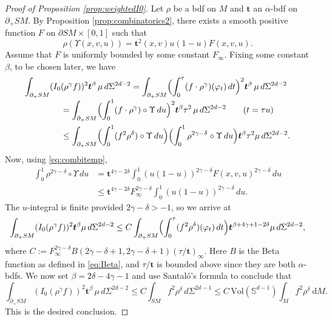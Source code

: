 \documentclass[11pt]{article}
\theoremstyle{plain}
\theoremstyle{definition}
\theoremstyle{remark}
\def\Sm{\mathbb{S}}
\newcommand{\bt}{{\boldsymbol{t}}}
\newcommand {\dM}{\mathrm{d}M}
\newcommand{\del}{\partial}
\begin{document}
\begin{proof}[Proof of Proposition \ref{prop:weightedI0}] Let $\rho$ be a bdf on $M$ and $\bt$ an $\alpha$-bdf on $\partial_+ SM$. By Proposition \ref{prop:combinatorics2}, there exists a smooth positive function $F$ on $\del SM\times [0,1]$ such that\vspace*{-3pt}
\begin{equation}
\rho (\Upsilon(x,v,u)) = \bt^2 (x,v) u(1-u) F(x,v,u).
\label{eq:combitemp}
\end{equation}
Assume that $F$ is uniformly bounded by some constant $F_\infty$. Fixing some constant $\beta$, to be chosen later, we have\vspace*{-5pt}
\begin{align*}
\int_{\partial_+ SM} (I_0 &(\rho^\gamma f))^2 \bt^\beta \, \mu \, d\Sigma^{2d-2} = \int_{\partial_+ SM} \Bigl(\int_0^\tau (f\cdot \rho^\gamma) (\varphi_t)\,dt \Bigr)^2 \bt^{\beta} \, \mu\,d\Sigma^{2d-2} \\[-3pt]
&= \int_{\partial_+ SM} \Bigl(\int_0^1 (f\cdot \rho^\gamma)\circ \Upsilon\,du \Bigr)^2 \bt^{\beta} \tau^2 \, \mu\,d\Sigma^{2d-2} \qquad (t=\tau u)\\
&\le \int_{\partial_+ SM} \Bigl(\int_0^1 (f^2 \rho^\delta)\circ \Upsilon\,du\Bigr) \Bigl(\int_0^1 \rho^{2\gamma-\delta}\circ \Upsilon\,du \Bigr) \bt^{\beta} \tau^2 \mu\,d\Sigma^{2d-2}.
\end{align*}
Now, using \eqref{eq:combitemp},
\begin{align*}
\int_0^1 \rho^{2\gamma-\delta}\circ \Upsilon\,du &= \bt^{4\gamma-2\delta} \int_0^1 (u(1-u))^{2\gamma-\delta} F(x,v,u)^{2\gamma-\delta}\,du \\
&\le \bt^{4\gamma-2\delta} F_{\infty}^{2\gamma-\delta} \int_0^1 (u(1-u))^{2\gamma-\delta}\,du.
\end{align*}
The $u$-integral is finite provided $2\gamma-\delta >-1$, so we arrive at
\begin{equation*}
\int_{\partial_+ SM} (I_0 (\rho^\gamma f))^2 \bt^\beta \mu\,d\Sigma^{2d-2} \le C \int_{\partial_+ SM} \Bigl(\int_0^\tau (f^2 \rho^\delta) (\varphi_t)\,dt\Bigr) \bt^{\beta+4\gamma+1-2\delta} \mu\,d\Sigma^{2d-2},
\end{equation*}
where $C := F_\infty^{2\gamma-\delta} B(2\gamma-\delta+1, 2\gamma-\delta+1) (\tau/\bt)_\infty$. Here $B$ is the Beta function as defined in \eqref{eq:Beta}, and $\tau/\bt$ is bounded above since they are both $\alpha$-bdfs. We now set $\beta = 2\delta-4\gamma-1$ and use Santaló's formula to conclude that
\begin{equation*}
\int_{\partial_+ SM} (I_0 (\rho^\gamma f))^2 \bt^\beta \, \mu \, d\Sigma^{2d-2} \le C \int_{SM} f^2 \rho^{\delta}\,d\Sigma^{2d-1} \le
C\, \mathrm{Vol}(\Sm^{d-1}) \int_M f^2 \rho^\delta\ \dM.
\end{equation*}
This is the desired conclusion.
\end{proof}
\end{document}
